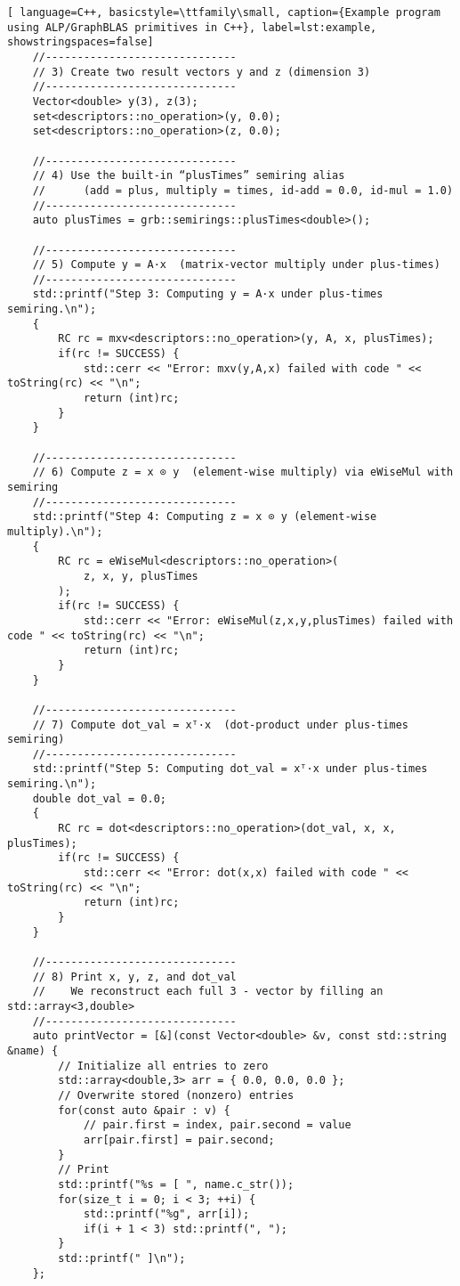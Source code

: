 \begin{lstlisting}[ language=C++, basicstyle=\ttfamily\small, caption={Example program using ALP/GraphBLAS primitives in C++}, label=lst:example, showstringspaces=false]
    //------------------------------
    // 3) Create two result vectors y and z (dimension 3)
    //------------------------------
    Vector<double> y(3), z(3);
    set<descriptors::no_operation>(y, 0.0);
    set<descriptors::no_operation>(z, 0.0);

    //------------------------------
    // 4) Use the built-in “plusTimes” semiring alias
    //      (add = plus, multiply = times, id‐add = 0.0, id-mul = 1.0)
    //------------------------------
    auto plusTimes = grb::semirings::plusTimes<double>();

    //------------------------------
    // 5) Compute y = A·x  (matrix‐vector multiply under plus‐times)
    //------------------------------
    std::printf("Step 3: Computing y = A·x under plus‐times semiring.\n");
    {
        RC rc = mxv<descriptors::no_operation>(y, A, x, plusTimes);
        if(rc != SUCCESS) {
            std::cerr << "Error: mxv(y,A,x) failed with code " << toString(rc) << "\n";
            return (int)rc;
        }
    }

    //------------------------------
    // 6) Compute z = x ⊙ y  (element‐wise multiply) via eWiseMul with semiring
    //------------------------------
    std::printf("Step 4: Computing z = x ⊙ y (element‐wise multiply).\n");
    {
        RC rc = eWiseMul<descriptors::no_operation>(
            z, x, y, plusTimes
        );
        if(rc != SUCCESS) {
            std::cerr << "Error: eWiseMul(z,x,y,plusTimes) failed with code " << toString(rc) << "\n";
            return (int)rc;
        }
    }
    
    //------------------------------
    // 7) Compute dot_val = xᵀ·x  (dot‐product under plus‐times semiring)
    //------------------------------
    std::printf("Step 5: Computing dot_val = xᵀ·x under plus‐times semiring.\n");
    double dot_val = 0.0;
    {
        RC rc = dot<descriptors::no_operation>(dot_val, x, x, plusTimes);
        if(rc != SUCCESS) {
            std::cerr << "Error: dot(x,x) failed with code " << toString(rc) << "\n";
            return (int)rc;
        }
    }

    //------------------------------
    // 8) Print x, y, z, and dot_val
    //    We reconstruct each full 3 - vector by filling an std::array<3,double>
    //------------------------------
    auto printVector = [&](const Vector<double> &v, const std::string &name) {
        // Initialize all entries to zero
        std::array<double,3> arr = { 0.0, 0.0, 0.0 };
        // Overwrite stored (nonzero) entries
        for(const auto &pair : v) {
            // pair.first = index, pair.second = value
            arr[pair.first] = pair.second;
        }
        // Print
        std::printf("%s = [ ", name.c_str());
        for(size_t i = 0; i < 3; ++i) {
            std::printf("%g", arr[i]);
            if(i + 1 < 3) std::printf(", ");
        }
        std::printf(" ]\n");
    };


\end{lstlisting}
